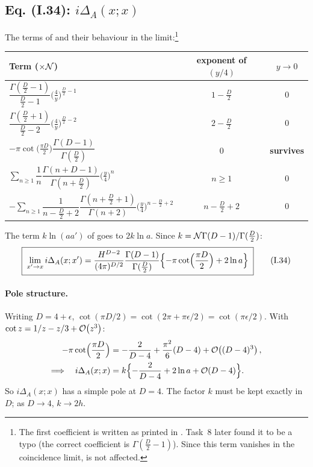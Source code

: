 \subsection{Eq. (I.34): \texorpdfstring{$i\Delta_A(x;x)$}{iDeltaA(x;x)} \texorpdfstring{\tD}{}}
The terms of  and their behaviour in the limit:\footnote{The first coefficient
is written as printed in . Task~8 later found it to be a typo (the correct
coefficient is \(\Gamma(\tfrac D2-1)\)). Since this term vanishes in the coincidence limit,
 is not affected.}
\begin{center}
\small
\renewcommand{\arraystretch}{1.6}
\begin{tabular}{@{}lcc@{}}
\toprule
Term (\(\times\mathcal N\)) & exponent of \((y/4)\) & \(y\to0\)\\
\midrule
\(\dfrac{\Gamma(\frac D2-1)}{\frac D2-1}\bigl(\tfrac4y\bigr)^{\frac D2-1}\) & \(1-\tfrac D2\) & \(0\)\\
\(\dfrac{\Gamma(\frac D2+1)}{\frac D2-2}\bigl(\tfrac4y\bigr)^{\frac D2-2}\) & \(2-\tfrac D2\) & \(0\)\\
\(-\pi\cot\bigl(\tfrac{\pi D}2\bigr)\dfrac{\Gamma(D-1)}{\Gamma(\frac D2)}\) & \(0\) & \textbf{survives}\\
\(\sum_{n\ge1}\dfrac1n\dfrac{\Gamma(n+D-1)}{\Gamma(n+\frac D2)}\bigl(\tfrac y4\bigr)^n\) & \(n\ge1\) & \(0\)\\
\(-\sum_{n\ge1}\dfrac{1}{n-\frac D2+2}\dfrac{\Gamma(n+\frac D2+1)}{\Gamma(n+2)}\bigl(\tfrac y4\bigr)^{n-\frac D2+2}\) & \(n-\tfrac D2+2\) & \(0\)\\
\bottomrule
\end{tabular}
\end{center}
The term \(k\ln(aa')\) of  goes to \(2k\ln a\). Since \(k=\mathcal N\Gamma(D-1)/\Gamma(\frac D2)\):
\begin{equation*}\label{eq:t4-I34}
\boxed{\;\lim_{x'\to x}i\Delta_A(x;x')=\frac{H^{D-2}}{(4\pi)^{D/2}}\frac{\Gamma(D-1)}{\Gamma(\frac D2)}\Bigl\{-\pi\cot\Bigl(\frac{\pi D}{2}\Bigr)+2\ln a\Bigr\}\;}
\tag{I.34}
\end{equation*}

\paragraph{Pole structure.} Writing \(D=4+\epsilon\),
\(\cot(\pi D/2)=\cot(2\pi+\pi\epsilon/2)=\cot(\pi\epsilon/2)\). With \(\cot z=1/z-z/3+\mathcal{O}\!\left(z^3\right)\):
\begin{equation}\label{eq:t4-pole}
\begin{aligned}
-\pi\cot\Bigl(\frac{\pi D}2\Bigr)&=-\frac{2}{D-4}+\frac{\pi^2}{6}(D-4)+\mathcal{O}\!\left((D-4)^3\right),\\
\Longrightarrow\quad i\Delta_A(x;x)&=k\Bigl\{-\frac{2}{D-4}+2\ln a+\mathcal{O}\!\left(D-4\right)\Bigr\}.
\end{aligned}
\end{equation}
So \(i\Delta_A(x;x)\) has a simple pole at \(D=4\). The factor \(k\) must be kept exactly in
\(D\); as \(D\to4\), \(k\to2h\).

